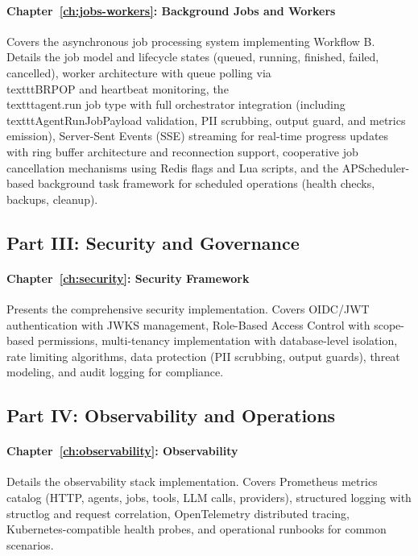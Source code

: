 \documentclass[a4paper,twoside]{sapthesis}
\begin{document}
\paragraph{Chapter~\ref{ch:jobs-workers}: Background Jobs and Workers}
Covers the asynchronous job processing system implementing Workflow B. Details the job model and lifecycle states (queued, running, finished, failed, cancelled), worker architecture with queue polling via \\texttt{BRPOP} and heartbeat monitoring, the \\texttt{agent.run} job type with full orchestrator integration (including \\texttt{AgentRunJobPayload} validation, PII scrubbing, output guard, and metrics emission), Server-Sent Events (SSE) streaming for real-time progress updates with ring buffer architecture and reconnection support, cooperative job cancellation mechanisms using Redis flags and Lua scripts, and the APScheduler-based background task framework for scheduled operations (health checks, backups, cleanup).

\subsection{Part III: Security and Governance}

\paragraph{Chapter~\ref{ch:security}: Security Framework}
Presents the comprehensive security implementation. Covers OIDC/JWT authentication with JWKS management, Role-Based Access Control with scope-based permissions, multi-tenancy implementation with database-level isolation, rate limiting algorithms, data protection (PII scrubbing, output guards), threat modeling, and audit logging for compliance.

\subsection{Part IV: Observability and Operations}

\paragraph{Chapter~\ref{ch:observability}: Observability}
Details the observability stack implementation. Covers Prometheus metrics catalog (HTTP, agents, jobs, tools, LLM calls, providers), structured logging with structlog and request correlation, OpenTelemetry distributed tracing, Kubernetes-compatible health probes, and operational runbooks for common scenarios.
\end{document}
